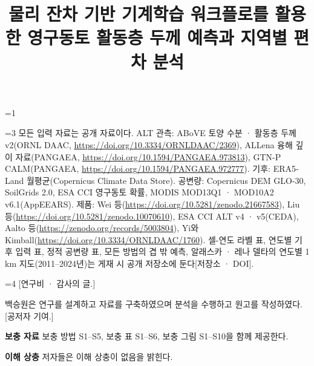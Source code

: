 \providecommand{\frontblock}{0}
\ifnum\frontblock=1
\title[물리 잔차 기반 기계학습의 연도별 활동층 두께 예측]{물리 잔차 기반 기계학습 워크플로를 활용한 영구동토 활동층 두께 예측과 지역별 편차 분석}

\author*[1]{}\email{[교신 저자 전자우편]}
\author[2]{\fnm{[공저자]} \sur{[극지연구소]}}


\fi

\ifnum\frontblock=3
모든 입력 자료는 공개 자료이다. ALT 관측: ABoVE 토양 수분 · 활동층 두께 v2(ORNL DAAC, \url{https://doi.org/10.3334/ORNLDAAC/2369}), ALLena 융해 깊이 자료(PANGAEA, \url{https://doi.org/10.1594/PANGAEA.973813}), GTN-P CALM(PANGAEA, \url{https://doi.org/10.1594/PANGAEA.972777}). 기후: ERA5-Land 월평균(Copernicus Climate Data Store). 공변량: Copernicus DEM GLO-30, SoilGrids 2.0, ESA CCI 영구동토 확률, MODIS MOD13Q1 · MOD10A2 v6.1(AppEEARS). 제품: Wei 등(\url{https://doi.org/10.5281/zenodo.21667583}), Liu 등(\url{https://doi.org/10.5281/zenodo.10070610}), ESA CCI ALT v4 · v5(CEDA), Aalto 등(\url{https://zenodo.org/records/5003804}), Yi와 Kimball(\url{https://doi.org/10.3334/ORNLDAAC/1760}). 셀-연도 라벨 표, 연도별 기후 입력 표, 정적 공변량 표, 모든 방법의 겹 밖 예측, 알래스카 · 레나 델타의 연도별 1 km 지도(2011--2024년)는 게재 시 공개 저장소에 둔다[저장소 · DOI].
\fi

\ifnum\frontblock=4
[연구비 · 감사의 글.]

백승원은 연구를 설계하고 자료를 구축하였으며 분석을 수행하고 원고를 작성하였다. [공저자 기여.]

\textbf{보충 자료} 보충 방법 S1--S5, 보충 표 S1--S6, 보충 그림 S1--S10을 함께 제공한다.

\textbf{이해 상충} 저자들은 이해 상충이 없음을 밝힌다.
\fi
